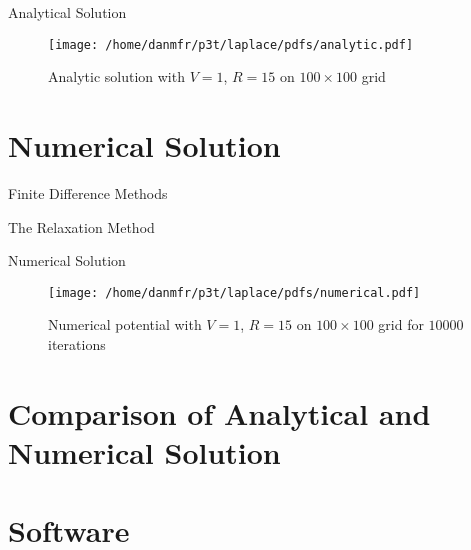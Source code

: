 \documentclass{beamer}
\begin{document}
\begin{frame}{Analytical Solution}

\begin{figure}[h!]
\begin{center}
\texttt{[image: /home/danmfr/p3t/laplace/pdfs/analytic.pdf]}
\caption{Analytic solution with $V=1$, $R=15$ on $100\times100$ grid}
\end{center}
\end{figure}

\end{frame}

\section{Numerical Solution}

\begin{frame}{Finite Difference Methods}
\end{frame}

\begin{frame}{The Relaxation Method}
\end{frame}

\begin{frame}{Numerical Solution}

\begin{figure}
\begin{center}
\texttt{[image: /home/danmfr/p3t/laplace/pdfs/numerical.pdf]}
\caption{Numerical potential with $V=1$, $R=15$ on $100\times100$ grid for $10000$ iterations}
\label{fig:numerical}
\end{center}
\end{figure}

\end{frame}

\section{Comparison of Analytical and Numerical Solution}

\section{Software}
\end{document}

